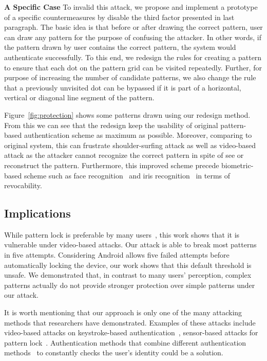 

\noindent \textbf{A Specific Case} To invalid this attack, we propose and implement a prototype of a specific countermeasures by disable the third factor presented in last paragraph. The basic idea is that before or after drawing the correct pattern, user can draw any pattern for the purpose of confusing the attacker. In other words, if the pattern drawn by user contains the correct pattern, the system would authenticate successfully. To this end, we redesign the rules for creating a pattern to ensure that each dot on the pattern grid can be visited repeatedly. Further, for purpose of increasing the number of candidate patterns, we also change the rule that a previously unvisited dot can be bypassed if it is part of a horizontal, vertical or diagonal line segment of the pattern.


Figure~\ref{fig:protection} shows some patterns drawn using our redesign method. From this we can see that the redesign keep the usability of original pattern-based authentication scheme as maximum as possible. Moreover, comparing to original system, this can frustrate shoulder-surfing attack as well as video-based attack as the attacker cannot recognize the correct pattern in spite of see or reconstruct the pattern. Furthermore, this improved scheme precede biometric-based scheme such as face recognition~\cite{turk1991face} and iris recognition~\cite{sanchez2001iris} in terms of revocability.


\subsection{Implications}
While pattern lock is preferable by many users~\cite{androidstudy}, this     work shows
that it is vulnerable under video-based attacks. Our attack
is able to break most patterns in five attempts. Considering Android
allows five failed attempts before automatically locking the device, our work
shows that this default threshold is unsafe. We demonstrated that, in contrast to many users'
perception, complex patterns actually do not provide stronger protection over simple patterns under our attack.

It is worth mentioning that our approach is only one of the many attacking
methods that researchers have demonstrated. Examples of these attacks include
video-based attacks on keystroke-based authentication~\cite{shukla2014beware,yue2014blind}, sensor-based attacks for
pattern lock~\cite{zhang2016privacy}. Authentication methods that combine different
authentication methods~\cite{de2012touch,stefan2012robustness,lingsecure,mannan2007using} to constantly checks the user's identity could be
a solution. %



